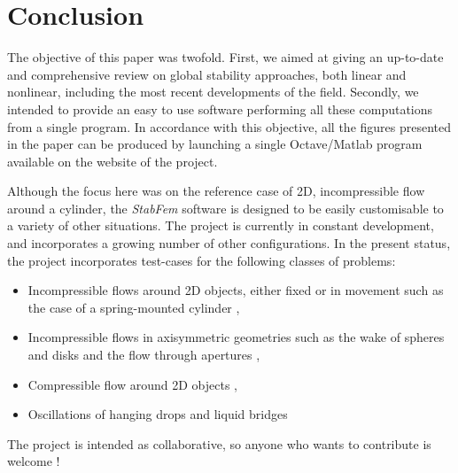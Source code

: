 \documentclass[twocolumn,10pt]{asme2ej}
\begin{document}

\section{Conclusion}


The objective of this paper was twofold. First, we aimed at giving an up-to-date and comprehensive review on global stability approaches, both linear and nonlinear, including the most recent developments of the field. 
Secondly, we intended to provide an easy to use software performing all these computations from a single program. In accordance with this objective, all the figures presented in the paper can be produced by launching a single Octave/Matlab program available on the website of the project.

Although the focus here was on the reference case of 2D, incompressible flow around a cylinder, the  {\em StabFem } software is designed to be easily customisable to a variety of other situations. The project is currently in constant development, and incorporates a growing number of other configurations. In the present status, the project incorporates test-cases for the following classes of problems:
\begin{itemize}
\item Incompressible flows around 2D objects, either fixed or in movement such as the case of a spring-mounted cylinder \cite{Navrose},
\item Incompressible flows in axisymmetric geometries such as the wake of spheres and disks \cite{Tchoufag2015} and the flow through apertures \cite{FabreISMA}, 
\item Compressible flow around 2D objects  \cite{Fani2018}, 
\item Oscillations of hanging drops and liquid bridges \cite{Chireux2015}
\end{itemize}
The project is intended as collaborative, so anyone who wants to contribute is welcome !





\end{document}
